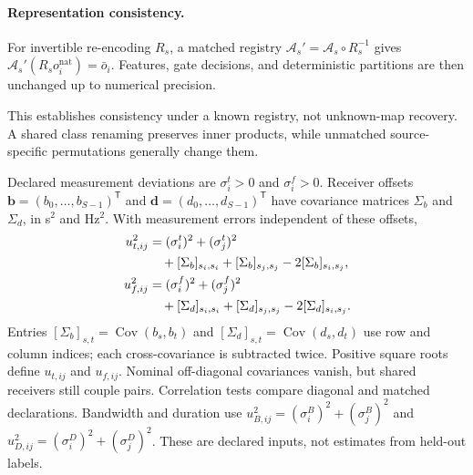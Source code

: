 \paragraph{Representation consistency.}
For invertible re-encoding $R_s$, a matched registry $\mathcal A_s'=\mathcal A_s\circ R_s^{-1}$ gives $\mathcal A_s'(R_s o_i^{\mathrm{nat}})=\bar o_i$. Features, gate decisions, and deterministic partitions are then unchanged up to numerical precision.

This establishes consistency under a known registry, not unknown-map recovery. A shared class renaming preserves inner products, while unmatched source-specific permutations generally change them.


Declared measurement deviations are $\sigma_i^t>0$ and $\sigma_i^f>0$. Receiver offsets $\mathbf b=(b_0,\ldots,b_{S-1})^{\mathsf T}$ and $\mathbf d=(d_0,\ldots,d_{S-1})^{\mathsf T}$ have covariance matrices $\Sigma_b$ and $\Sigma_d$, in s$^2$ and Hz$^2$. With measurement errors independent of these offsets,
\begin{align}
 u_{t,ij}^2&=(\sigma_i^t)^2+(\sigma_j^t)^2 \notag\\
 &\quad+[\Sigma_b]_{s_i,s_i}+[\Sigma_b]_{s_j,s_j}
             -2[\Sigma_b]_{s_i,s_j},\label{eq:covariance}\\
 u_{f,ij}^2&=(\sigma_i^f)^2+(\sigma_j^f)^2 \notag\\
 &\quad+[\Sigma_d]_{s_i,s_i}+[\Sigma_d]_{s_j,s_j}
             -2[\Sigma_d]_{s_i,s_j}.\label{eq:covfreq}
\end{align}
Entries $[\Sigma_b]_{s,t}=\operatorname{Cov}(b_s,b_t)$ and $[\Sigma_d]_{s,t}=\operatorname{Cov}(d_s,d_t)$ use row and column indices; each cross-covariance is subtracted twice.
Positive square roots define $u_{t,ij}$ and $u_{f,ij}$. Nominal off-diagonal covariances vanish, but shared receivers still couple pairs. Correlation tests compare diagonal and matched declarations. Bandwidth and duration use $u_{B,ij}^2=(\sigma_i^B)^2+(\sigma_j^B)^2$ and $u_{D,ij}^2=(\sigma_i^D)^2+(\sigma_j^D)^2$. These are declared inputs, not estimates from held-out labels.

